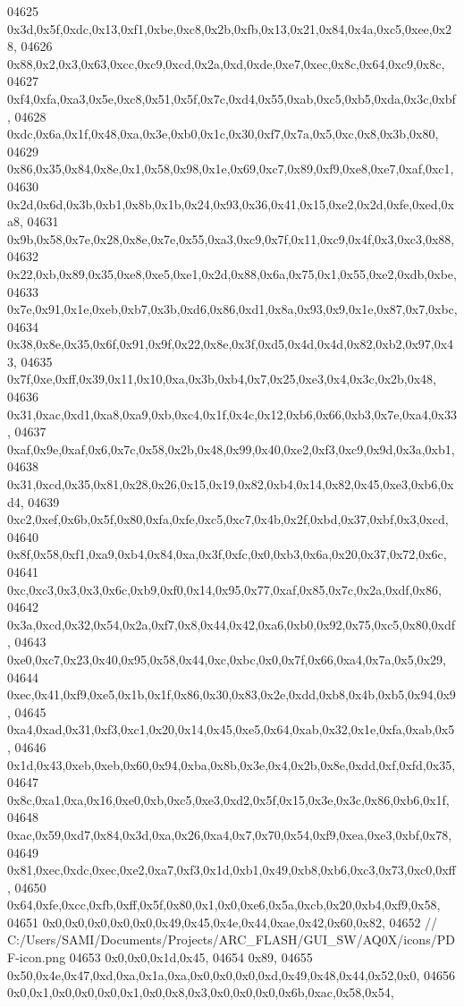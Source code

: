 \begin{DoxyCode}
04625   0x3d,0x5f,0xdc,0x13,0xf1,0xbe,0xc8,0x2b,0xfb,0x13,0x21,0x84,0x4a,0xc5,0xee,0x28,
04626   0x88,0x2,0x3,0x63,0xcc,0xc9,0xcd,0x2a,0xd,0xde,0xe7,0xec,0x8c,0x64,0xc9,0x8c,
04627   0xf4,0xfa,0xa3,0x5e,0xc8,0x51,0x5f,0x7c,0xd4,0x55,0xab,0xc5,0xb5,0xda,0x3c,0xbf,
04628   0xdc,0x6a,0x1f,0x48,0xa,0x3e,0xb0,0x1c,0x30,0xf7,0x7a,0x5,0xc,0x8,0x3b,0x80,
04629   0x86,0x35,0x84,0x8e,0x1,0x58,0x98,0x1e,0x69,0xc7,0x89,0xf9,0xe8,0xe7,0xaf,0xc1,
04630   0x2d,0x6d,0x3b,0xb1,0x8b,0x1b,0x24,0x93,0x36,0x41,0x15,0xe2,0x2d,0xfe,0xed,0xa8,
04631   0x9b,0x58,0x7e,0x28,0x8e,0x7e,0x55,0xa3,0xc9,0x7f,0x11,0xc9,0x4f,0x3,0xc3,0x88,
04632   0x22,0xb,0x89,0x35,0xe8,0xe5,0xe1,0x2d,0x88,0x6a,0x75,0x1,0x55,0xe2,0xdb,0xbe,
04633   0x7e,0x91,0x1e,0xeb,0xb7,0x3b,0xd6,0x86,0xd1,0x8a,0x93,0x9,0x1e,0x87,0x7,0xbc,
04634   0x38,0x8e,0x35,0x6f,0x91,0x9f,0x22,0x8e,0x3f,0xd5,0x4d,0x4d,0x82,0xb2,0x97,0x43,
04635   0x7f,0xe,0xff,0x39,0x11,0x10,0xa,0x3b,0xb4,0x7,0x25,0xe3,0x4,0x3c,0x2b,0x48,
04636   0x31,0xac,0xd1,0xa8,0xa9,0xb,0xc4,0x1f,0x4c,0x12,0xb6,0x66,0xb3,0x7e,0xa4,0x33,
04637   0xaf,0x9e,0xaf,0x6,0x7c,0x58,0x2b,0x48,0x99,0x40,0xe2,0xf3,0xc9,0x9d,0x3a,0xb1,
04638   0x31,0xcd,0x35,0x81,0x28,0x26,0x15,0x19,0x82,0xb4,0x14,0x82,0x45,0xe3,0xb6,0xd4,
04639   0xc2,0xef,0x6b,0x5f,0x80,0xfa,0xfe,0xc5,0xc7,0x4b,0x2f,0xbd,0x37,0xbf,0x3,0xcd,
04640   0x8f,0x58,0xf1,0xa9,0xb4,0x84,0xa,0x3f,0xfc,0x0,0xb3,0x6a,0x20,0x37,0x72,0x6c,
04641   0xc,0xc3,0x3,0x3,0x6c,0xb9,0xf0,0x14,0x95,0x77,0xaf,0x85,0x7c,0x2a,0xdf,0x86,
04642   0x3a,0xcd,0x32,0x54,0x2a,0xf7,0x8,0x44,0x42,0xa6,0xb0,0x92,0x75,0xc5,0x80,0xdf,
04643   0xe0,0xc7,0x23,0x40,0x95,0x58,0x44,0xc,0xbc,0x0,0x7f,0x66,0xa4,0x7a,0x5,0x29,
04644   0xec,0x41,0xf9,0xe5,0x1b,0x1f,0x86,0x30,0x83,0x2e,0xdd,0xb8,0x4b,0xb5,0x94,0x9,
04645   0xa4,0xad,0x31,0xf3,0xc1,0x20,0x14,0x45,0xe5,0x64,0xab,0x32,0x1e,0xfa,0xab,0x5,
04646   0x1d,0x43,0xeb,0xeb,0x60,0x94,0xba,0x8b,0x3e,0x4,0x2b,0x8e,0xdd,0xf,0xfd,0x35,
04647   0x8c,0xa1,0xa,0x16,0xe0,0xb,0xc5,0xe3,0xd2,0x5f,0x15,0x3e,0x3c,0x86,0xb6,0x1f,
04648   0xac,0x59,0xd7,0x84,0x3d,0xa,0x26,0xa4,0x7,0x70,0x54,0xf9,0xea,0xe3,0xbf,0x78,
04649   0x81,0xec,0xdc,0xec,0xe2,0xa7,0xf3,0x1d,0xb1,0x49,0xb8,0xb6,0xc3,0x73,0xc0,0xff,
04650   0x64,0xfe,0xcc,0xfb,0xff,0x5f,0x80,0x1,0x0,0xe6,0x5a,0xcb,0x20,0xb4,0xf9,0x58,
04651   0x0,0x0,0x0,0x0,0x0,0x49,0x45,0x4e,0x44,0xae,0x42,0x60,0x82,
04652     \textcolor{comment}{// C:/Users/SAMI/Documents/Projects/ARC\_FLASH/GUI\_SW/AQ0X/icons/PDF-icon.png}
04653   0x0,0x0,0x1d,0x45,
04654   0x89,
04655   0x50,0x4e,0x47,0xd,0xa,0x1a,0xa,0x0,0x0,0x0,0xd,0x49,0x48,0x44,0x52,0x0,
04656   0x0,0x1,0x0,0x0,0x0,0x1,0x0,0x8,0x3,0x0,0x0,0x0,0x6b,0xac,0x58,0x54,

\end{DoxyCode}
